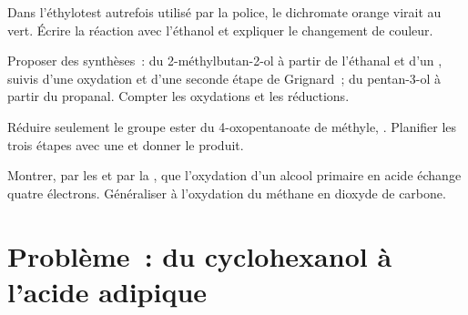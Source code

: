 \begin{exercise}[$\star\star$]\label{exo:b1:organic-redox:9}
Dans l'éthylotest autrefois utilisé par la police, le dichromate orange
virait au vert. Écrire la réaction avec l'éthanol et expliquer le
changement de couleur.
\end{exercise}

\begin{exercise}[$\star\star\star$]\label{exo:b1:organic-redox:10}
Proposer des synthèses~: du 2-méthylbutan-2-ol à partir de l'éthanal et
d'un , suivis d'une oxydation et d'une seconde étape de
Grignard~; du pentan-3-ol à partir du propanal. Compter les oxydations
et les réductions.
\end{exercise}

\begin{exercise}[$\star\star\star$]\label{exo:b1:organic-redox:11}
Réduire seulement le groupe ester du 4-oxopentanoate de méthyle,
. Planifier les trois étapes avec une  et
donner le produit.
\end{exercise}

\begin{exercise}[$\star\star\star$]\label{exo:b1:organic-redox:12}
Montrer, par les  et par la , que
l'oxydation d'un alcool primaire en acide échange quatre électrons.
Généraliser à l'oxydation du méthane en dioxyde de carbone.
\end{exercise}

\section{Problème~: du cyclohexanol à l'acide adipique}

